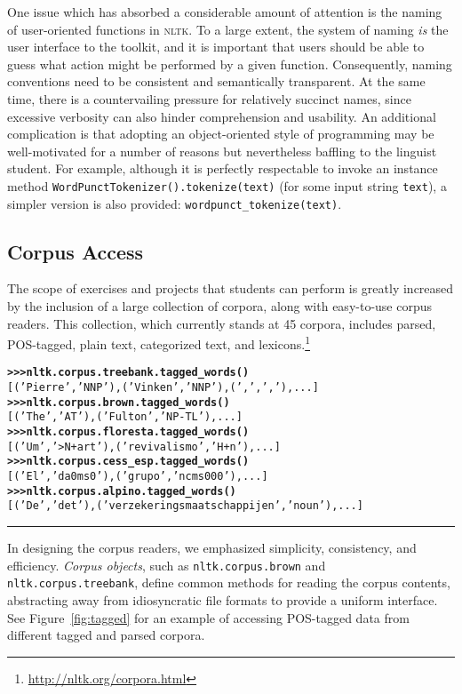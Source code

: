\documentclass[11pt]{article}
\newcommand{\NLTK}{\textsc{nltk}}
\newcommand{\code}[1]{\texttt{\small #1}}
\begin{document}
One issue which has absorbed a considerable amount of attention is the
naming of user-oriented functions in \NLTK. To a large extent, the
system of naming \emph{is} the user interface to the toolkit, and it is
important that users should be able to guess what action might be
performed by a given function. Consequently, naming conventions need
to be consistent and semantically transparent. At the same time, there is a
countervailing pressure for relatively succinct names, since excessive verbosity
can also hinder comprehension and usability. An additional
complication is that adopting an object-oriented style of programming
may be well-motivated for a number of reasons but nevertheless
baffling to the linguist student. For example, although it is
perfectly respectable to invoke an instance method
\code{WordPunctTokenizer().tokenize(text)} (for some input
string \code{text}), a simpler version is also provided:
\code{wordpunct\_tokenize(text)}.

\subsection{Corpus Access}

The scope of exercises and projects that students can perform is
greatly increased by the inclusion of a large collection of corpora,
along with easy-to-use corpus readers.  This collection, which
currently stands at 45 corpora, includes parsed, POS-tagged, plain
text, categorized text, and lexicons.\footnote{\url{http://nltk.org/corpora.html}}

\begin{figure*}[t]
{\small
\begin{alltt}
\textbf{>>> nltk.corpus.treebank.tagged_words()}
[('Pierre', 'NNP'), ('Vinken', 'NNP'), (',', ','), ...]
\textbf{>>> nltk.corpus.brown.tagged_words()}
[('The', 'AT'), ('Fulton', 'NP-TL'), ...]
\textbf{>>> nltk.corpus.floresta.tagged_words()}
[('Um', '>N+art'), ('revivalismo', 'H+n'), ...]
\textbf{>>> nltk.corpus.cess_esp.tagged_words()}
[('El', 'da0ms0'), ('grupo', 'ncms000'), ...]
\textbf{>>> nltk.corpus.alpino.tagged_words()}
[('De', 'det'), ('verzekeringsmaatschappijen', 'noun'), ...]
\end{alltt}}
\caption{Accessing Different Corpora via a Uniform Interface}
\label{fig:tagged}
\vspace*{1ex}\hrule
\end{figure*}

In designing the corpus readers, we emphasized simplicity,
consistency, and efficiency.  \emph{Corpus objects}, such as
\code{nltk.corpus.brown} and \code{nltk.corpus.treebank}, define
common methods for reading the corpus contents, abstracting
away from idiosyncratic file formats to provide a uniform interface.
See Figure~\ref{fig:tagged} for an example of accessing POS-tagged
data from different tagged and parsed corpora.
\end{document}
